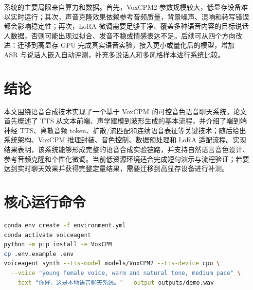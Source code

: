 \documentclass[UTF8,a4paper,12pt]{ctexart}
\begin{document}
系统的主要局限来自算力和数据。首先，VoxCPM2 参数规模较大，低显存设备难以实时运行；其次，声音克隆效果依赖参考音频质量，背景噪声、混响和转写错误都会影响稳定性；再次，LoRA 微调需要足够干净、覆盖多种语音内容的目标说话人数据，否则可能出现过拟合、发音不稳或情感表达不足。后续可从四个方向改进：迁移到高显存 GPU 完成真实语音实验，接入更小或量化后的模型，增加 ASR 与说话人嵌入自动评测，补充多说话人和多风格样本进行系统比较。

\section{结论}
本文围绕语音合成技术实现了一个基于 VoxCPM 的可控音色语音聊天系统。论文首先概述了 TTS 从文本前端、声学建模到波形生成的基本流程，并介绍了端到端神经 TTS、离散音频 token、扩散/流匹配和连续语音表征等关键技术；随后给出系统架构、VoxCPM 推理封装、音色控制、数据预处理和 LoRA 适配流程。实现结果表明，该系统能够形成完整的语音合成实验链路，并支持自然语言音色设计、参考音频克隆和个性化微调。当前低资源环境适合完成短句演示与流程验证；若要达到实时聊天效果并获得完整定量结果，需要迁移到高显存设备进行补测。




\appendix
\section{核心运行命令}
\begin{lstlisting}[language=bash]
conda env create -f environment.yml
conda activate voiceagent
python -m pip install -e VoxCPM
cp .env.example .env
voiceagent synth --tts-model models/VoxCPM2 --tts-device cpu \
  --voice "young female voice, warm and natural tone, medium pace" \
  --text "你好，这是本地语音聊天系统。" --output outputs/demo.wav
\end{lstlisting}
\end{document}

